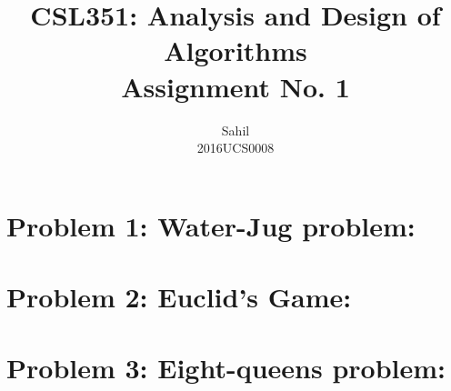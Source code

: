 \documentclass[12pt]{report}
\title{\centering CSL351: Analysis and Design of Algorithms \\Assignment No. 1}
\author{\LARGE Sahil\\2016UCS0008}
\begin{document}
\maketitle

\section{Problem 1: Water-Jug problem:}

\section{Problem 2: Euclid's Game:}

\section{Problem 3: Eight-queens problem:}

\end{document}
